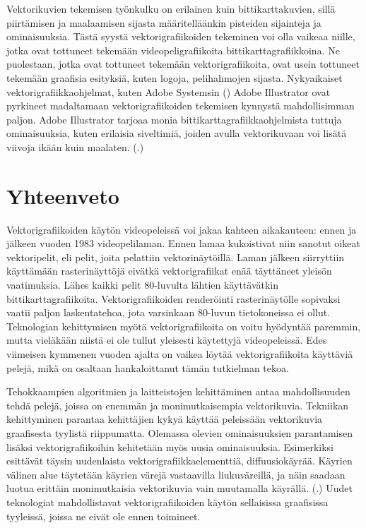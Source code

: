 \documentclass[utf8,bachelor]{gradu3}
\newcommand{\parencitedot}[1]{(\cite{#1}.)}
\begin{document}
Vektorikuvien tekemisen työnkulku on erilainen kuin bittikarttakuvien, sillä piirtämisen ja maalaamisen sijasta määritelläänkin pisteiden sijainteja ja ominaisuuksia. Tästä syystä vektorigrafiikoiden tekeminen voi olla vaikeaa niille, jotka ovat tottuneet tekemään videopeligrafiikoita bittikarttagrafiikkoina. Ne puolestaan, jotka ovat tottuneet tekemään vektorigrafiikoita, ovat usein tottuneet tekemään graafisia esityksiä, kuten logoja, pelihahmojen sijasta. Nykyaikaiset vektorigrafiikkaohjelmat, kuten Adobe Systemsin (\citeyear{RefWorks:doc:5bf1ca5ee4b03fd0c4891238}) Adobe Illustrator ovat pyrkineet madaltamaan vektorigrafiikoiden tekemisen kynnystä mahdollisimman paljon. Adobe Illustrator tarjoaa monia bittikarttagrafiikkaohjelmista tuttuja ominaisuuksia, kuten erilaisia siveltimiä, joiden avulla vektorikuvaan voi lisätä viivoja ikään kuin maalaten. \parencitedot{RefWorks:doc:5bf1ca5ee4b03fd0c4891238}

\chapter{Yhteenveto}


Vektorigrafiikoiden käytön videopeleissä voi jakaa kahteen aikakauteen: ennen ja jälkeen vuoden 1983 videopelilaman. Ennen lamaa kukoistivat niin sanotut oikeat vektoripelit, eli pelit, joita pelattiin vektorinäytöillä. Laman jälkeen siirryttiin käyttämään rasterinäyttöjä eivätkä vektorigrafiikat enää täyttäneet yleisön vaatimuksia. Lähes kaikki pelit 80-luvulta lähtien käyttävätkin bittikarttagrafiikoita. Vektorigrafiikoiden renderöinti rasterinäytölle sopivaksi vaatii paljon laskentatehoa, jota varsinkaan 80-luvun tietokoneissa ei ollut. Teknologian kehittymisen myötä vektorigrafiikoita on voitu hyödyntää paremmin, mutta vieläkään niistä ei ole tullut yleisesti käytettyjä videopeleissä. Edes viimeisen kymmenen vuoden ajalta on vaikea löytää vektorigrafiikoita käyttäviä pelejä, mikä on osaltaan hankaloittanut tämän tutkielman tekoa.

Tehokkaampien algoritmien ja laitteistojen kehittäminen antaa mahdollisuuden tehdä pelejä, joissa on enemmän ja monimutkaisempia vektorikuvia. Tekniikan kehittyminen parantaa kehittäjien kykyä käyttää peleissään vektorikuvia graafisesta tyylistä riippumatta. Olemassa olevien ominaisuuksien parantamisen lisäksi vektorigrafiikoihin kehitetään myös uusia ominaisuuksia. Esimerkiksi \textcite{RefWorks:doc:5bfd0d4de4b0bf300b66d3fe} esittävät täysin uudenlaista vektorigrafiikkaelementtiä, diffuusiokäyrää. Käyrien välinen alue täytetään käyrien värejä vastaavilla liukuväreillä, ja näin saadaan luotua erittäin monimutkaisia vektorikuvia vain muutamalla käyrällä. \parencitedot{RefWorks:doc:5bfd0d4de4b0bf300b66d3fe} Uudet teknologiat mahdollistavat vektorigrafiikoiden käytön sellaisissa graafisissa tyyleissä, joissa ne eivät ole ennen toimineet.
\end{document}
